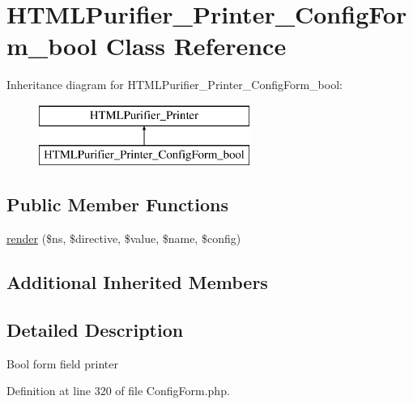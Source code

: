 \hypertarget{classHTMLPurifier__Printer__ConfigForm__bool}{\section{H\+T\+M\+L\+Purifier\+\_\+\+Printer\+\_\+\+Config\+Form\+\_\+bool Class Reference}
\label{classHTMLPurifier__Printer__ConfigForm__bool}
}
Inheritance diagram for H\+T\+M\+L\+Purifier\+\_\+\+Printer\+\_\+\+Config\+Form\+\_\+bool\+:\begin{figure}[H]
\begin{center}
\leavevmode
\includegraphics[height=2.000000cm]{classHTMLPurifier__Printer__ConfigForm__bool}
\end{center}
\end{figure}
\subsection*{Public Member Functions}
\begin{DoxyCompactItemize}
\item 
\hyperlink{classHTMLPurifier__Printer__ConfigForm__bool_a70130adcdc4e2a1b4f4a6ce42f94a91e}{render} (\$ns, \$directive, \$value, \$name, \$config)
\end{DoxyCompactItemize}
\subsection*{Additional Inherited Members}


\subsection{Detailed Description}
Bool form field printer 

Definition at line 320 of file Config\+Form.\+php.



